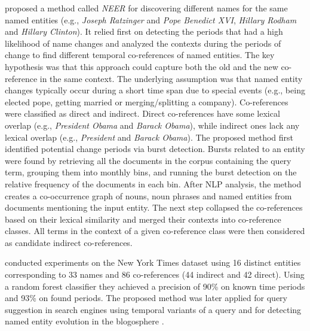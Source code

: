 \documentclass[output=paper]{langsci/langscibook}
\begin{document}
\citet{tahmasebi2012neer} proposed a method called \emph{NEER} for discovering different names for the same named entities (e.g.,  \emph{Joseph Ratzinger} and \emph{Pope Benedict XVI}, \emph{Hillary Rodham} and \emph{Hillary Clinton}).
It relied first on detecting the periods that had a high likelihood of name changes and analyzed the contexts during the periods of change to find different temporal co-references of named entities. The key hypothesis was that this approach could capture both the old and the new co-reference in the same context. The underlying assumption was that named entity changes typically occur during a short time span due to special events (e.g., being elected pope, getting married or merging/splitting a company). Co-references were classified as direct and indirect. Direct co-references have some lexical overlap (e.g.,  \emph{President Obama} and \emph{Barack Obama}), while indirect ones lack any lexical overlap (e.g.,  \emph{President} and \emph{Barack Obama}). The proposed method first identified potential change periods via burst detection. Bursts related to an entity were found by retrieving all the documents in the corpus containing the query term, grouping them into monthly bins, and running the burst detection on the relative frequency of the documents in each bin. After NLP analysis, the method creates a co-occurrence graph of nouns, noun phrases and named entities from documents mentioning the input entity. The next step collapsed the co-references based on their lexical similarity and merged their contexts into co-reference classes. All terms in the context of a given co-reference class were then considered as candidate indirect co-references. 

\citet{tahmasebi2012neer} conducted experiments on the New York Times dataset using 16 distinct entities corresponding to 33 names and 86 co-references (44 indirect and 42 direct). Using a random forest classifier they achieved a precision of
90\% on known time periods and 93\% on found periods. 
The proposed method was later applied for query suggestion in search engines using temporal variants of a query \citep{holzmann2012fokas} and for detecting named entity evolution in the blogosphere \citep{holzmann2015named}.
\end{document}
